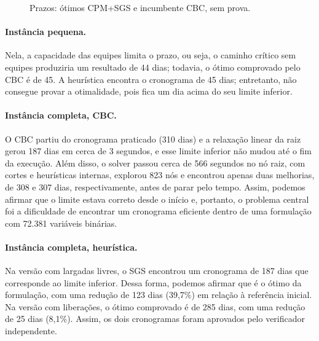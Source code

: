 \begin{figure}[htbp]
  \centering
  \caption{Prazos: ótimos CPM+SGS e incumbente CBC, sem prova.}
  \label{fig:prazos}
\end{figure}

\paragraph{Instância pequena.}
Nela, a capacidade das equipes limita o prazo, ou seja, o caminho crítico sem
equipes produziria um resultado de 44 dias; todavia, o ótimo comprovado pelo CBC é de 45. A
heurística encontra o cronograma de 45 dias; entretanto, não consegue provar a
otimalidade, pois fica um dia acima do seu limite inferior.

\paragraph{Instância completa, CBC.}
O CBC partiu do cronograma praticado (310 dias) e a relaxação linear da
raiz gerou 187 dias em cerca de 3 segundos, e esse limite inferior não
mudou até o fim da execução. Além disso, o solver passou cerca de 566 segundos no nó raiz, com
cortes e heurísticas internas, explorou 823 nós e encontrou apenas duas
melhorias, de 308 e 307 dias, respectivamente, antes de parar pelo tempo. Assim, podemos afirmar que o limite estava
correto desde o início e, portanto, o problema central foi a dificuldade de encontrar um cronograma eficiente
dentro de uma formulação com 72.381 variáveis binárias.

\paragraph{Instância completa, heurística.}
Na versão com largadas livres, o SGS encontrou um cronograma de 187 dias que corresponde ao limite inferior. Dessa forma, podemos afirmar que é o ótimo da formulação, com uma redução de 123 dias (39,7\%) em relação à referência inicial. Na versão com liberações, o
ótimo comprovado é de 285 dias, com uma redução de 25 dias (8,1\%). Assim, os dois
cronogramas foram aprovados pelo verificador independente.

